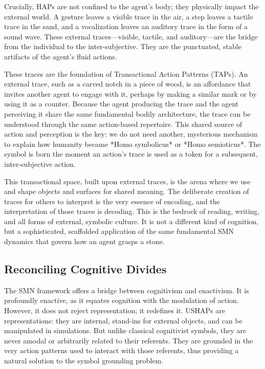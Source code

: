 Crucially, HAPs are not confined to the agent's body; they physically impact the external world. A gesture leaves a visible trace in the air, a step leaves a tactile trace in the sand, and a vocalization leaves an auditory trace in the form of a sound wave. These external traces—visible, tactile, and auditory—are the bridge from the individual to the inter-subjective. They are the punctuated, stable artifacts of the agent's fluid actions.

These traces are the foundation of Transactional Action Patterns (TAPs). An external trace, such as a carved notch in a piece of wood, is an affordance that invites another agent to engage with it, perhaps by making a similar mark or by using it as a counter. Because the agent producing the trace and the agent perceiving it share the same fundamental bodily architecture, the trace can be understood through the same action-based repertoire. This shared source of action and perception is the key: we do not need another, mysterious mechanism to explain how humanity became *Homo symbolicus* or *Homo semioticus*. The symbol is born the moment an action's trace is used as a token for a subsequent, inter-subjective action.

This transactional space, built upon external traces, is the arena where we use and shape objects and surfaces for shared meaning. The deliberate creation of traces for others to interpret is the very essence of encoding, and the interpretation of those traces is decoding. This is the bedrock of reading, writing, and all forms of external, symbolic culture. It is not a different kind of cognition, but a sophisticated, scaffolded application of the same fundamental SMN dynamics that govern how an agent grasps a stone.

\subsection*{Reconciling Cognitive Divides}
The SMN framework offers a bridge between cognitivism and enactivism. It is profoundly enactive, as it equates cognition with the modulation of action. However, it does not reject representation; it redefines it. USHAPs are representations: they are internal, stand-ins for external objects, and can be manipulated in simulations. But unlike classical cognitivist symbols, they are never amodal or arbitrarily related to their referents. They are grounded in the very action patterns used to interact with those referents, thus providing a natural solution to the symbol grounding problem.

